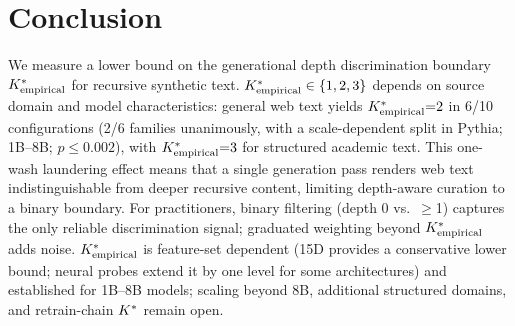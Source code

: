 \section{Conclusion}
\label{sec:conclusion}

We measure a lower bound on the generational depth discrimination boundary ${K^*_{\text{empirical}}}$ for recursive synthetic text.
${K^*_{\text{empirical}}} \in \{1, 2, 3\}$ depends on source domain and model characteristics: general web text yields ${K^*_{\text{empirical}}}{=}2$ in 6/10 configurations (2/6 families unanimously, with a scale-dependent split in Pythia; 1B--8B; $p \leq 0.002$), with ${K^*_{\text{empirical}}}{=}3$ for structured academic text.
This one-wash laundering effect means that a single generation pass renders web text indistinguishable from deeper recursive content, limiting depth-aware curation to a binary boundary.
For practitioners, binary filtering (depth 0 vs.\ $\geq$1) captures the only reliable discrimination signal; graduated weighting beyond ${K^*_{\text{empirical}}}$ adds noise.
${K^*_{\text{empirical}}}$ is feature-set dependent (15D provides a conservative lower bound; neural probes extend it by one level for some architectures) and established for 1B--8B models; scaling beyond 8B, additional structured domains, and retrain-chain ${K^*}$ remain open.
